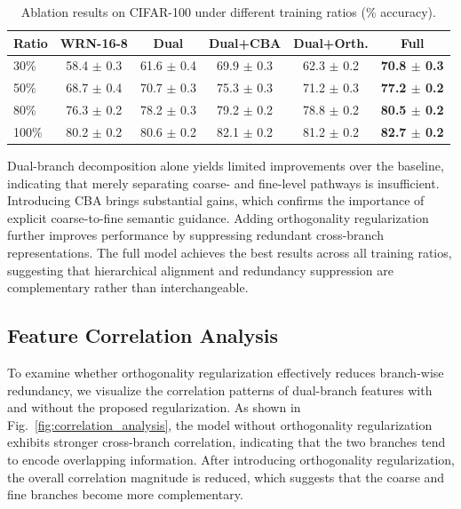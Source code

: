 \documentclass[pdflatex,sn-mathphys-num]{sn-jnl}
\theoremstyle{thmstyleone}%
\theoremstyle{thmstyletwo}%
\theoremstyle{thmstylethree}%
\begin{document}
\begin{table}[htbp]
    \centering
    \caption{Ablation results on CIFAR-100 under different training ratios (\% accuracy).}
    \label{tab:ablation_all}
    \setlength{\tabcolsep}{4pt}
    \renewcommand{\arraystretch}{1.1}
    \small
    \begin{tabular}{@{}lccccc@{}}
    \toprule
    \textbf{Ratio} & \textbf{WRN-16-8} & \textbf{Dual} & \textbf{Dual+CBA} & \textbf{Dual+Orth.} & \textbf{Full} \\
    \midrule
    30\%  & 58.4 $\pm$ 0.3 & 61.6 $\pm$ 0.4 & 69.9 $\pm$ 0.3 & 62.3 $\pm$ 0.2 & \textbf{70.8 $\pm$ 0.3} \\
    50\%  & 68.7 $\pm$ 0.4 & 70.7 $\pm$ 0.3 & 75.3 $\pm$ 0.3 & 71.2 $\pm$ 0.3 & \textbf{77.2 $\pm$ 0.2} \\
    80\%  & 76.3 $\pm$ 0.2 & 78.2 $\pm$ 0.3 & 79.2 $\pm$ 0.2 & 78.8 $\pm$ 0.2 & \textbf{80.5 $\pm$ 0.2} \\
    100\% & 80.2 $\pm$ 0.2 & 80.6 $\pm$ 0.2 & 82.1 $\pm$ 0.2 & 81.2 $\pm$ 0.2 & \textbf{82.7 $\pm$ 0.2} \\
    \bottomrule
    \end{tabular}
\end{table}

Dual-branch decomposition alone yields limited improvements over the baseline, indicating that merely separating coarse- and fine-level pathways is insufficient. 
Introducing CBA brings substantial gains, which confirms the importance of explicit coarse-to-fine semantic guidance. 
Adding orthogonality regularization further improves performance by suppressing redundant cross-branch representations. 
The full model achieves the best results across all training ratios, suggesting that hierarchical alignment and redundancy suppression are complementary rather than interchangeable.

\subsection{Feature Correlation Analysis}

To examine whether orthogonality regularization effectively reduces branch-wise redundancy, we visualize the correlation patterns of dual-branch features with and without the proposed regularization. 
As shown in Fig.~\ref{fig:correlation_analysis}, the model without orthogonality regularization exhibits stronger cross-branch correlation, indicating that the two branches tend to encode overlapping information. 
After introducing orthogonality regularization, the overall correlation magnitude is reduced, which suggests that the coarse and fine branches become more complementary.
\end{document}

